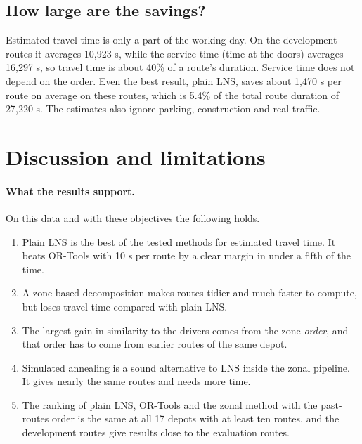 \documentclass[11pt,a4paper]{article}
\begin{document}
\begin{table}[t]
\centering\small
\caption{Ablation of zonal LNS (past-routes order, $\lambda=60$ s, 207 development routes, seed 0). The last two columns are paired differences to the default. For travel time, positive means less saving than the default, and for the score, negative means closer to the driver.}\label{tab:ablation}

\end{table}

\subsection{How large are the savings?}
Estimated travel time is only a part of the working day. On the development routes it averages 10,923 s, while the service time (time at the doors) averages 16,297 s, so travel time is about 40\% of a route's duration. Service time does not depend on the order. Even the best result, plain LNS, saves about 1,470 s per route on average on these routes, which is 5.4\% of the total route duration of 27,220 s. The estimates also ignore parking, construction and real traffic.

\section{Discussion and limitations}\label{sec:limits}
\paragraph{What the results support.} On this data and with these objectives the following holds.
\begin{enumerate}
\item Plain LNS is the best of the tested methods for estimated travel time. It beats OR-Tools with 10 s per route by a clear margin in under a fifth of the time.
\item A zone-based decomposition makes routes tidier and much faster to compute, but loses travel time compared with plain LNS.
\item The largest gain in similarity to the drivers comes from the zone \emph{order}, and that order has to come from earlier routes of the same depot.
\item Simulated annealing is a sound alternative to LNS inside the zonal pipeline. It gives nearly the same routes and needs more time.
\item The ranking of plain LNS, OR-Tools and the zonal method with the past-routes order is the same at all 17 depots with at least ten routes, and the development routes give results close to the evaluation routes.
\end{enumerate}
\end{document}
